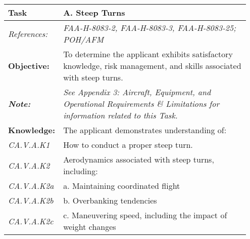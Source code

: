 \begin{table}[H]
\begin{tabular}%
  {>{\raggedleft\arraybackslash}p{0.15\linewidth}%
   >{\raggedright\arraybackslash}p{0.8\linewidth}%
  }
\textbf{Task}                                                       & \textbf{A. Steep Turns}                                                                                                          \\ \hline
\textit{References:}                                                & \textit{FAA-H-8083-2, FAA-H-8083-3, FAA-H-8083-25; POH/AFM}                                                                      \\
\textbf{Objective:}                                                 & To determine the applicant exhibits satisfactory knowledge, risk management, and skills associated with steep turns.             \\
\textit{\textbf{Note:}}                                             & \textit{See Appendix 3: Aircraft, Equipment, and Operational Requirements \& Limitations for information related to this Task.}  \\ \hline
\textbf{Knowledge:}                                                 & The applicant demonstrates understanding of:                                                                                     \\
\textit{CA.V.A.K1}                                                  & How to conduct a proper steep turn.                                                                                              \\
\textit{CA.V.A.K2}                                                  & Aerodynamics associated with steep turns, including:                                                                             \\
\textit{CA.V.A.K2a}                                                 & a. Maintaining coordinated flight                                                                                                \\
\textit{CA.V.A.K2b}                                                 & b. Overbanking tendencies                                                                                                        \\
\textit{CA.V.A.K2c}                                                 & c. Maneuvering speed, including the impact of weight changes                                                                     \\

\end{tabular}
\end{table}
